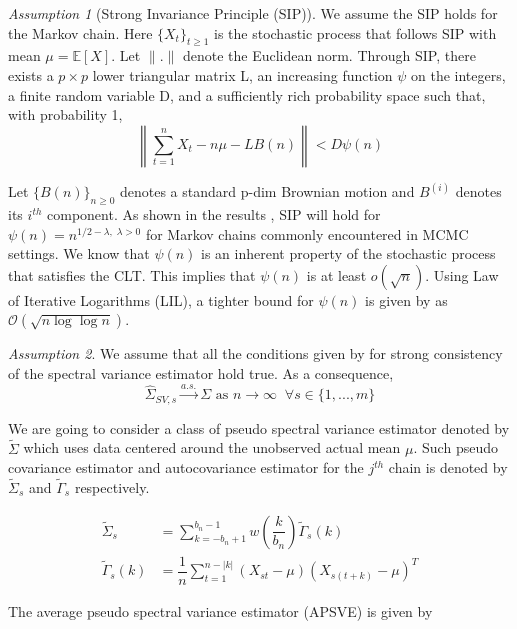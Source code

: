 \documentclass[11pt]{article}
\theoremstyle{remark}
\newtheorem{ass}{Assumption}
\begin{document}
\begin{ass}[Strong Invariance Principle (SIP)] \label{ass:sip}
    We assume the SIP holds for the Markov chain. Here $\{X_t\}_{t\geq 1}$ is the stochastic process that follows SIP with mean $\mu = \mathbb{E}[X]$. Let $\|.\|$ denote the Euclidean norm. Through SIP, there exists a $p \times p$ lower triangular matrix L, an increasing function $\psi$ on the integers, a finite random variable D, and a  sufficiently rich probability space such that, with probability 1, \\
  $$\left\|\sum_{t=1}^{n}X_t - n\mu - LB(n)\right\| < D\psi(n)$$
  
  Let $\{B(n)\}_{n\geq 0}$ denotes a standard p-dim Brownian motion and $B^{(i)}$ denotes its $i^{th}$ component. As shown in the results \cite{kuelbs1980almost}, SIP will hold for $\psi(n) = n^{1/2 - \lambda, \; \lambda > 0}$ for Markov chains commonly encountered in MCMC settings. We know that $\psi(n)$ is an inherent property of the stochastic process that satisfies the CLT. This implies that $\psi(n)$ is at least $o(\sqrt{n})$. Using Law of Iterative Logarithms (LIL), a tighter bound for $\psi(n)$ is given by \cite{stra:1964} as $\mathcal{O}(\sqrt{n\log \log n})$.
\end{ass}


\begin{ass} \label{ass:sve_consis} We assume that all the conditions given by \cite{vats:fleg:jon:2018} for strong consistency of the spectral variance estimator hold true. As a consequence, 
\[
\hat{\Sigma}_{SV,s} \xrightarrow{a.s.} \Sigma \textrm{ as } n \to \infty \;\; \forall s \in \{1,..., m\}
\]
\end{ass}


We are going to consider a class of pseudo spectral variance estimator denoted by $\tilde{\Sigma}$ which uses data centered around the unobserved actual mean $\mu$. Such pseudo covariance estimator and autocovariance estimator for the $j^{th}$ chain is denoted by $\tilde{\Sigma}_s$ and $\tilde{\Gamma}_s$ respectively.

\begin{align*}
    \tilde{\Sigma}_s &= \sum_{k=-b_n+1}^{b_n-1}w\left(\dfrac{k}{b_n}\right)\tilde{\Gamma}_s(k)\\
    \tilde{\Gamma}_s(k) &= \dfrac{1}{n}\sum_{t=1}^{n-|k|}(X_{st}-\mu)(X_{s(t+k)}-\mu)^T
\end{align*}

The average pseudo spectral variance estimator (APSVE) is given by
\end{document}
